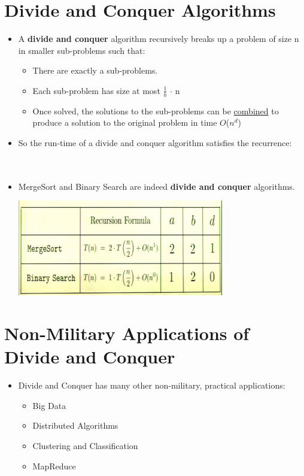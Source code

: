 \documentclass[12pt]{article}
\begin{document}
\section{Divide and Conquer Algorithms}
\renewcommand{\labelitemii}{$\circ$}
\renewcommand{\labelitemiii}{$\cdot$}
\renewcommand{\labelitemiii}{$\rightarrow$}
\renewcommand{\labelitemiv}{$\star$}
\begin{itemize}
\item A \textbf{divide and conquer} algorithm recursively breaks up a problem of size n in smaller sub-problems such that:
	\begin{itemize}
	\item There are exactly a sub-problems.
	\item Each sub-problem has size at most {\large $\frac{1}{b}$ $\cdot$ n}
	\item Once solved, the solutions to the sub-problems can be \underline{combined} to produce 	a solution to the original problem in time $O$($n^d$)
	\end{itemize}
\item So the run-time of a divide and conquer algorithm satisfies the recurrence:\\
\\
 \hspace*{\fill} \\
\item MergeSort and Binary Search are indeed \textbf{divide and conquer} algorithms.
	\begin{center}
	\includegraphics{lecture2g}
	\end{center}	
\end{itemize}



\section{Non-Military Applications of Divide and Conquer}
\renewcommand{\labelitemii}{$\circ$}
\renewcommand{\labelitemiii}{$\cdot$}
\renewcommand{\labelitemiii}{$\rightarrow$}
\renewcommand{\labelitemiv}{$\star$}
\begin{itemize}
\item Divide and Conquer has many other non-military, practical applications:
	\begin{itemize}
	\item Big Data
	\item Distributed Algorithms
	\item Clustering and Classification
	\item MapReduce
	\end{itemize}
\end{itemize}
\end{document}
